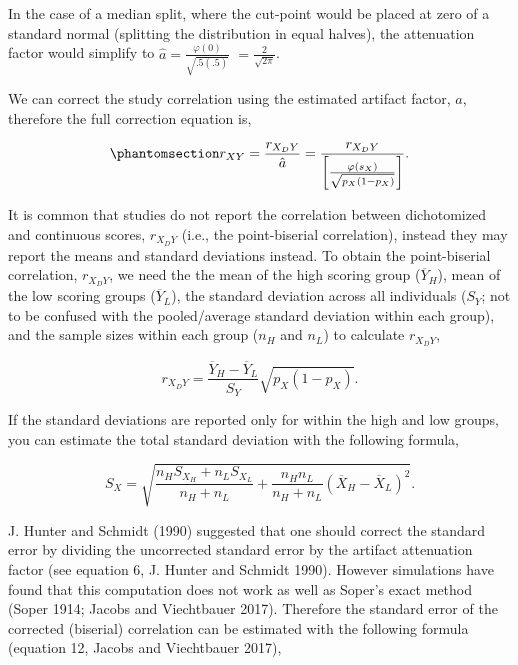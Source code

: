 \documentclass[
  letterpaper,
  DIV=11,
  numbers=noendperiod]{scrreprt}
\begin{document}
In the case of a median split, where the cut-point would be placed at
zero of a standard normal (splitting the distribution in equal halves),
the attenuation factor would simplify to
\(\hat{a} =\frac{\varphi(0)}{\sqrt{.5(.5)}}\)
\(=\frac{2}{\sqrt{2\pi}}\).

We can correct the study correlation using the estimated artifact
factor, \(\hat{a}\), therefore the full correction equation is,

\begin{equation}\phantomsection\label{eq-dich-r}{
r_{XY} = \frac{r_{X_DY}}{\hat{a}} = \frac{r_{X_DY}}{\left[\frac{\varphi\left(s_X\right)}{\sqrt{p_X(1-p_X)}}\right]}.
}\end{equation}

\begin{tcolorbox}[enhanced jigsaw, opacityback=0, coltitle=black, toprule=.15mm, colframe=quarto-callout-tip-color-frame, bottomtitle=1mm, rightrule=.15mm, colbacktitle=quarto-callout-tip-color!10!white, left=2mm, bottomrule=.15mm, breakable, title={Converting to \(\boldsymbol{\mathsf{r_{X_{D}Y}}}\) from means and
standard deviations}, colback=white, opacitybacktitle=0.6, titlerule=0mm, arc=.35mm, leftrule=.75mm, toptitle=1mm]

It is common that studies do not report the correlation between
dichotomized and continuous scores, \(r_{X_DY}\) (i.e., the
point-biserial correlation), instead they may report the means and
standard deviations instead. To obtain the point-biserial correlation,
\(r_{X_D Y}\), we need the the mean of the high scoring group
(\(\overline{Y}_H\)), mean of the low scoring groups
(\(\overline{Y}_L\)), the standard deviation across all individuals
(\(S_Y\); not to be confused with the pooled/average standard deviation
within each group), and the sample sizes within each group (\(n_H\) and
\(n_L\)) to calculate \(r_{X_DY}\),

\[
r_{X_D Y} =\frac{\overline{Y}_H-\overline{Y}_L}{S_Y} \sqrt{p_X(1-p_X)}.
\]

If the standard deviations are reported only for within the high and low
groups, you can estimate the total standard deviation with the following
formula,

\[
S_X = \sqrt{\frac{n_HS_{X_H} + n_L S_{X_L}}{n_H + n_L} +\frac{n_Hn_L}{n_H + n_L}(\overline{X}_H - \overline{X}_L)^2}.
\]

\end{tcolorbox}

J. Hunter and Schmidt (1990) suggested that one should correct the
standard error by dividing the uncorrected standard error by the
artifact attenuation factor (see equation 6, J. Hunter and Schmidt
1990). However simulations have found that this computation does not
work as well as Soper's exact method (Soper 1914; Jacobs and Viechtbauer
2017). Therefore the standard error of the corrected (biserial)
correlation can be estimated with the following formula (equation 12,
Jacobs and Viechtbauer 2017),
\end{document}
